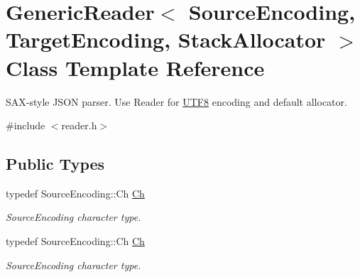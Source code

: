 \hypertarget{class_generic_reader}{}\section{Generic\+Reader$<$ Source\+Encoding, Target\+Encoding, Stack\+Allocator $>$ Class Template Reference}
\label{class_generic_reader}


S\+A\+X-\/style J\+S\+ON parser. Use Reader for \hyperlink{struct_u_t_f8}{U\+T\+F8} encoding and default allocator.  




{\ttfamily \#include $<$reader.\+h$>$}

\subsection*{Public Types}
\begin{DoxyCompactItemize}
\item 
typedef Source\+Encoding\+::\+Ch \hyperlink{class_generic_reader_ab39a92bb26d50aee6469df604622218a}{Ch}\hypertarget{class_generic_reader_ab39a92bb26d50aee6469df604622218a}{}\label{class_generic_reader_ab39a92bb26d50aee6469df604622218a}

\begin{DoxyCompactList}\small\item\em Source\+Encoding character type. \end{DoxyCompactList}\item 
typedef Source\+Encoding\+::\+Ch \hyperlink{class_generic_reader_ab39a92bb26d50aee6469df604622218a}{Ch}\hypertarget{class_generic_reader_ab39a92bb26d50aee6469df604622218a}{}\label{class_generic_reader_ab39a92bb26d50aee6469df604622218a}

\begin{DoxyCompactList}\small\item\em Source\+Encoding character type. \end{DoxyCompactList}\end{DoxyCompactItemize}
